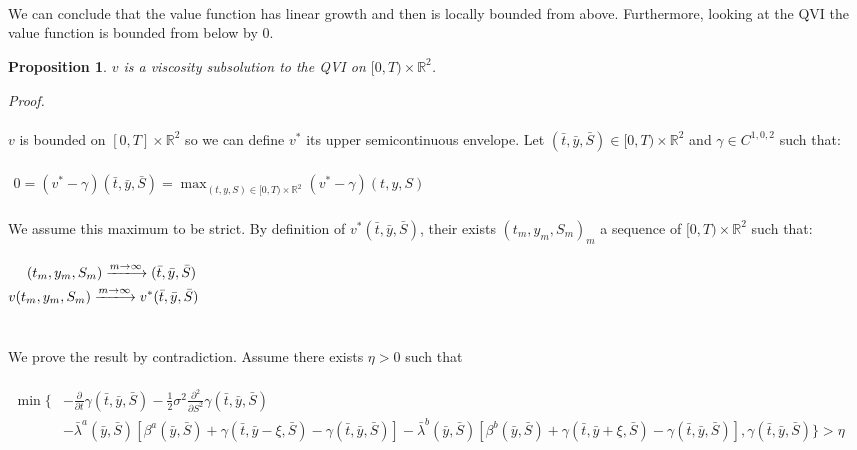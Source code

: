 \documentclass[8pt]{article}
\newtheorem{prop}{Proposition}
\begin{document}
\\ \\ \\
We can conclude that the value function has linear growth and then is locally bounded from above. Furthermore, looking at the QVI the value function is bounded from below by 0.
\\
\begin{prop}
$v$ is a viscosity subsolution to the QVI on $ [0,T) \times \mathbb{R}^2$.
\end{prop}



\textit{Proof.} 
\\ \\
$v$ is bounded on $ [0,T] \times \mathbb{R}^2$ so we can define $v^*$ its upper semicontinuous envelope. Let $(\bar{t},\bar{y},\bar{S}) \in [0,T) \times \mathbb{R}^2$ and $\gamma \in C^{1,0,2}$ such that:
\\ \\
$\begin{aligned}
0 = (v^*-\gamma)(\bar{t},\bar{y},\bar{S}) = \max_{(t,y,S) \in [0,T) \times \mathbb{R}^2}(v^*-\gamma)(t,y,S)
\end{aligned}$
\\ \\
We assume this maximum to be strict. By definition of $v^*(\bar{t}, \bar{y}, \bar{S})$, their exists $(t_m, y_m, S_m)_m$ a sequence of $[0,T) \times \mathbb{R}^2$ such that:
\\ \\
$\begin{aligned}
(t_m, y_m, S_m) \xlongrightarrow{m \to \infty} (\bar{t}, \bar{y}, \bar{S}) \, \\
v(t_m, y_m, S_m) \xlongrightarrow{m \to \infty} v^{*}(\bar{t}, \bar{y}, \bar{S})
\end{aligned}$
\\ \\ \\
We prove the result by contradiction. Assume there exists $\eta > 0$ such that
\\ \\
$\begin{aligned}
\min \big\{ 
&- \frac{\partial}{\partial t} \gamma(\bar{t}, \bar{y}, \bar{S})
- \frac{1}{2} \sigma^2 \frac{\partial^2}{\partial S^2} \gamma(\bar{t}, \bar{y}, \bar{S}) \\
& - \bar{\lambda}^a(\bar{y}, \bar{S}) \left[ \beta^a(\bar{y},\bar{S}) + \gamma(\bar{t}, \bar{y} - \xi, \bar{S}) - \gamma(\bar{t}, \bar{y}, \bar{S}) \right] - \bar{\lambda}^b(\bar{y}, \bar{S}) \left[ \beta^b(\bar{y},\bar{S}) + \gamma(\bar{t}, \bar{y} + \xi, \bar{S}) - \gamma(\bar{t}, \bar{y}, \bar{S}) \right], \gamma(\bar{t}, \bar{y}, \bar{S}) 
\big\} > \eta
\end{aligned}$
\end{document}

